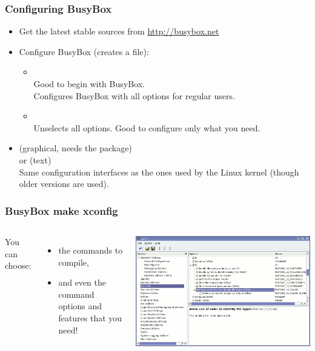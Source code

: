 \begin{frame}
  \frametitle{Configuring BusyBox}
  \begin{itemize}
  \item Get the latest stable sources from \url{http://busybox.net}
  \item Configure BusyBox (creates a  file):
    \begin{itemize}
    \item {}\\
      Good to begin with BusyBox.\\
      Configures BusyBox with all options for regular users.
    \item {}\\
      Unselects all options. Good to configure only what you need.
    \end{itemize}
  \item {} (graphical, needs the  package)\\
    or  (text)\\
    Same configuration interfaces as the ones used by the Linux kernel
    (though older versions are used).
  \end{itemize}
\end{frame}

\begin{frame}
  \frametitle{BusyBox make xconfig}
  \begin{columns}
    You can choose:
    \begin{itemize}
    \item the commands to compile,
    \item and even the command options and features that you need!
    \end{itemize}
    \includegraphics[width=\textwidth]{slides/sysdev-busybox/xconfig-screenshot.png}
  \end{columns}
\end{frame}

